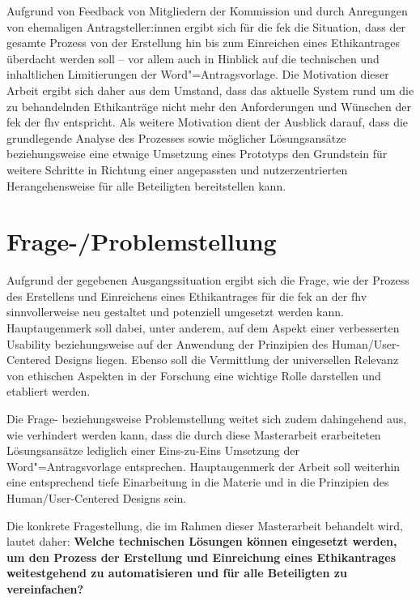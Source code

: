 \documentclass[a4paper,12pt,twoside]{scrreprt}
\begin{document}
\medskip

Aufgrund von Feedback von Mitgliedern der Kommission und durch Anregungen von ehemaligen Antragsteller:innen ergibt sich für die \acl{fek} die Situation, dass der gesamte Prozess von der Erstellung hin bis zum Einreichen eines Ethikantrages überdacht werden soll -- vor allem auch in Hinblick auf die technischen und inhaltlichen Limitierungen der Word"=Antragsvorlage. Die Motivation dieser Arbeit ergibt sich daher aus dem Umstand, dass das aktuelle System rund um die zu behandelnden Ethikanträge nicht mehr den Anforderungen und Wünschen der \acl{fek} der \acl{fhv} entspricht. Als weitere Motivation dient der Ausblick darauf, dass die grundlegende Analyse des Prozesses sowie möglicher Lösungsansätze beziehungsweise eine etwaige Umsetzung eines Prototyps den Grundstein für weitere Schritte in Richtung einer angepassten und nutzerzentrierten Herangehensweise für alle Beteiligten bereitstellen kann. 

\section{Frage-/Problemstellung}
\label{sec:frage-problemstellung}

Aufgrund der gegebenen Ausgangssituation ergibt sich die Frage, wie der Prozess des Erstellens und Einreichens eines Ethikantrages für die \acl{fek} an der \acl{fhv} sinnvollerweise neu gestaltet und potenziell umgesetzt werden kann. Hauptaugenmerk soll dabei, unter anderem, auf dem Aspekt einer verbesserten Usability beziehungsweise auf der Anwendung der Prinzipien des Human/User-Centered Designs liegen. Ebenso soll die Vermittlung der universellen Relevanz von ethischen Aspekten in der Forschung eine wichtige Rolle darstellen und etabliert werden.

Die Frage- beziehungsweise Problemstellung weitet sich zudem dahingehend aus, wie verhindert werden kann, dass die durch diese Masterarbeit erarbeiteten Lösungsansätze lediglich einer Eins-zu-Eins Umsetzung der Word"=Antragsvorlage entsprechen. Hauptaugenmerk der Arbeit soll weiterhin eine entsprechend tiefe Einarbeitung in die Materie und in die Prinzipien des Human/User-Centered Designs sein.

\medskip

Die konkrete Fragestellung, die im Rahmen dieser Masterarbeit behandelt wird, lautet daher:\newline
\textbf{Welche technischen Lösungen können eingesetzt werden, um den Prozess der Erstellung und Einreichung eines Ethikantrages weitestgehend zu automatisieren und für alle Beteiligten zu vereinfachen?}
\end{document}
